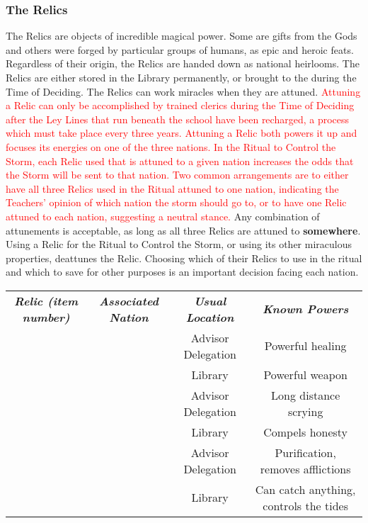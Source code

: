 \documentclass[blue]{GL2020}
\begin{document}
\subsubsection*{The Relics}
The Relics are objects of incredible magical power. Some are gifts from the Gods and others were forged by particular groups of humans, as epic and heroic feats. Regardless of their origin, the Relics are handed down as national heirlooms. The Relics are either stored in the \pSchool{} Library permanently, or brought to the \pSc{} during the Time of Deciding. The Relics can work miracles when they are attuned.\textcolor{red}{ Attuning a Relic can only be accomplished by trained clerics during the Time of Deciding after the Ley Lines that run beneath the school have been recharged, a process which must take place every three years. Attuning a Relic both powers it up and focuses its energies on one of the three nations. In the Ritual to Control the Storm, each Relic used that is attuned to a given nation increases the odds that the Storm will be sent to that nation. Two common arrangements are to either have all three Relics used in the Ritual attuned to one nation, indicating the Teachers’ opinion of which nation the storm should go to, or to have one Relic attuned to each nation, suggesting a neutral stance.} Any combination of attunements is acceptable, as long as all three Relics are attuned to \textbf{somewhere}. Using a Relic for the Ritual to Control the Storm, or using its other miraculous properties, deattunes the Relic. Choosing which of their Relics to use in the ritual and which to save for other purposes is an important decision facing each nation.

\begin{tabularx}{\textwidth}{|>{\centering\arraybackslash}c | >{\centering\arraybackslash}c | >{\centering\arraybackslash}c | >{\centering\arraybackslash}c |}
\hline
    \multicolumn{4}{|c|}{\textbf{The Relics}} \\
\hline
    \emph{\textbf{Relic (item number)}} & \emph{\textbf{Associated Nation}} & \emph{\textbf{Usual Location}} & \emph{\textbf{Known Powers}}\\
\hline
    \iPitcher{} & \pFarm{} & Advisor Delegation & Powerful healing\\
\hline
    \iScythe{} & \pFarm{} & Library & Powerful weapon\\
\hline
    \iMirror{} & \pTech{} & Advisor Delegation & Long distance scrying\\
\hline
    \iLariat{} & \pTech{} & Library & Compels honesty\\
\hline
    \iChalice{} & \pShip{} & Advisor Delegation & Purification, removes afflictions\\
\hline
    \iNet{} & \pShip{} & Library & Can catch anything, controls the tides\\
\hline
\end{tabularx}
\end{document}
